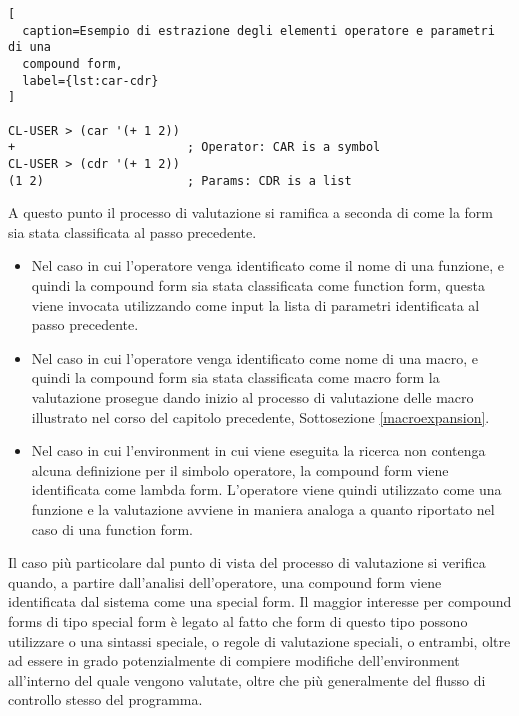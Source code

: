\begin{lstlisting}[
  caption=Esempio di estrazione degli elementi operatore e parametri di una
  compound form,
  label={lst:car-cdr}
]

CL-USER > (car '(+ 1 2))
+                        ; Operator: CAR is a symbol
CL-USER > (cdr '(+ 1 2))
(1 2)                    ; Params: CDR is a list

\end{lstlisting}

A questo punto il processo di valutazione si ramifica a seconda di come la
form sia stata classificata al passo precedente.

\begin{itemize}

\item Nel caso in cui l’operatore venga identificato come il nome di una
funzione, e quindi la compound form sia stata classificata come function form,
questa viene invocata utilizzando come input la lista di parametri
identificata al passo precedente.

\item Nel caso in cui l’operatore venga identificato come nome di una macro, e
quindi la compound form sia stata classificata come macro form la valutazione
prosegue dando inizio al processo di valutazione delle macro illustrato nel
corso del capitolo precedente, Sottosezione \ref{macroexpansion}.

\item Nel caso in cui l’environment in cui viene eseguita la ricerca non
contenga alcuna definizione per il simbolo operatore, la compound form viene
identificata come lambda form. L’operatore viene quindi utilizzato come una
funzione e la valutazione avviene in maniera analoga a quanto riportato nel
caso di una function form.

\end{itemize}

Il caso più particolare dal punto di vista del processo di valutazione si
verifica quando, a partire dall’analisi dell’operatore, una compound form
viene identificata dal sistema come una special form. Il maggior interesse per
compound forms di tipo special form è legato al fatto che form di questo tipo
possono utilizzare o una sintassi speciale, o regole di valutazione speciali,
o entrambi, oltre ad essere in grado potenzialmente di compiere modifiche
dell’environment all’interno del quale vengono valutate, oltre che più
generalmente del flusso di controllo stesso del programma.

